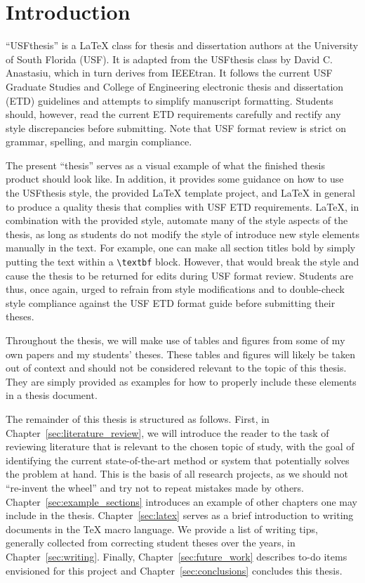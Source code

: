 \section{Introduction}\label{sec:introduction}
``USFthesis'' is a LaTeX class for thesis and dissertation authors at the University of South Florida (USF). It is adapted from the USFthesis class by David C. Anastasiu, which in turn derives from IEEEtran. It follows the current USF Graduate Studies and College of Engineering electronic thesis and dissertation (ETD) guidelines and attempts to simplify manuscript formatting. Students should, however, read the current ETD requirements carefully and rectify any style discrepancies before submitting. Note that USF format review is strict on grammar, spelling, and margin compliance.

The present ``thesis'' serves as a visual example of what the finished thesis product should look like. In addition, it provides some guidance on how to use the USFthesis style, the provided LaTeX template project, and LaTeX in general to produce a quality thesis that complies with USF ETD requirements. LaTeX, in combination with the provided style, automate many of the style aspects of the thesis, as long as students do not modify the style of introduce new style elements manually in the text. For example, one can make all section titles bold by simply putting the text within a \texttt{{\textbackslash}textbf} block. However, that would break the style and cause the thesis to be returned for edits during USF format review. Students are thus, once again, urged to refrain from style modifications and to double-check style compliance against the USF ETD format guide before submitting their theses.

Throughout the thesis, we will make use of tables and figures from some of my own papers and my students' theses. These tables and figures will likely be taken out of context and should not be considered relevant to the topic of this thesis. They are simply provided as examples for how to properly include these elements in a thesis document.

The remainder of this thesis is structured as follows. First, in Chapter~\ref{sec:literature_review}, we will introduce the reader to the task of reviewing literature that is relevant to the chosen topic of study, with the goal of identifying the current state-of-the-art method or system that potentially solves the problem at hand. This is the basis of all research projects, as we should not ``re-invent the wheel'' and try not to repeat mistakes made by others. Chapter~\ref{sec:example_sections} introduces an example of other chapters one may include in the thesis. Chapter~\ref{sec:latex} serves as a brief introduction to writing documents in the TeX macro language. We provide a list of writing tips, generally collected from correcting student theses over the years, in Chapter~\ref{sec:writing}. Finally, Chapter~\ref{sec:future_work} describes to-do items envisioned for this project and Chapter~\ref{sec:conclusions} concludes this thesis.

